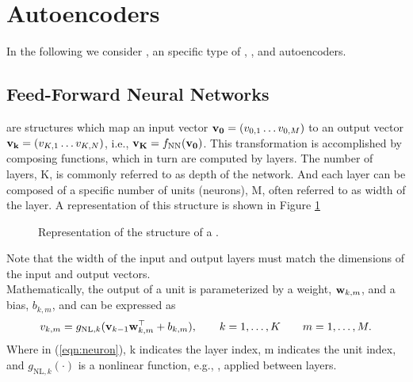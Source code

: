 	
\section{Autoencoders}
In the following we consider , an specific type of , , and autoencoders.

\subsection{Feed-Forward Neural Networks}
 are structures which map an input vector $\bold{v_0} = (v_{0,1} \dots v_{0,M})$ to an output vector $\bold{v_k} = (v_{K,1} \dots v_{K,N})$, i.e., $\bold{v_K}=f_{\text{NN}}(\bold{v_0})$. This transformation is accomplished by composing functions, which in turn are computed by layers. The number of layers, K, is commonly referred to as depth of the network. And each layer can be composed of a specific number of units (neurons), M, often referred to as width of the layer. A representation of this structure is shown in Figure \ref{fig:ffnn}

\begin{figure}[H]
	\centering
	
	\caption{Representation of the structure of a .}
	\label{fig:ffnn}
\end{figure}


Note that the width of the input and output layers must match the dimensions of the input and output vectors.\\
Mathematically, the output of a unit is parameterized by a weight, $\bold{w}_{k,m}$, and a bias, $b_{k,m}$, and can be expressed as
\begin{align}
	v_{k,m} = g_{\text{NL},k}(\vb{v}_{k-1}\vb{w}^\top_{k,m} + b_{k,m}), \qquad k = 1, \dots, K \qquad m = 1, \dots, M.
	\label{eqn:neuron}
\end{align}
Where in (\ref{eqn:neuron}), k indicates the layer index, m indicates the unit index, and $g_{\text{NL},k}(\cdot)$ is a nonlinear function, e.g., , applied between layers.

